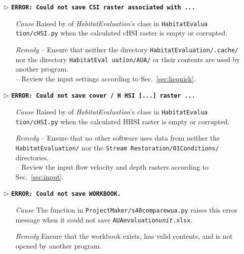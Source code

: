 \begin{itemize}
	\item[$\triangleright$]\textbf{\texttt{ERROR: Could not save CSI raster associated with ...}}
	\begin{itemize}
		\item[\textit{Cause}\hspace{0.27cm}] Raised by  of \textit{HabitatEvaluation}'s  class in \texttt{HabitatEvalua tion/cHSI.py} when the calculated cHSI raster is empty or corrupted.
		\item[\textit{Remedy}] -- Ensure that neither the directory \texttt{HabitatEvaluation/.cache/} nor the directory \texttt{HabitatEval uation/AUA/} or their contents are used by another program.\\
							 -- Review the input settings according to Sec.~\ref{sec:hequick}.\\
	\end{itemize}
	
	\item[$\triangleright$]\textbf{\texttt{ERROR: Could not save cover / H HSI [...] raster ...}}
	\begin{itemize}
		\item[\textit{Cause}\hspace{0.27cm}] Raised by  of \textit{HabitatEvaluation}'s  class in \texttt{HabitatEvalua tion/cHSI.py} when the calculated HHSI raster is empty or corrupted.
		\item[\textit{Remedy}]  -- Ensure that no other software uses data from neither the \texttt{HabitatEvaluation/} nor the \texttt{Stream Restoration/01{\myUnderscore}Conditions/} directories.\\
							 -- Review the input flow velocity and depth rasters according to Sec.~\ref{sec:input}.\\
	\end{itemize}
	
	\item[$\triangleright$]\textbf{\texttt{ERROR: Could not save WORKBOOK.}}
	\begin{itemize}
		\item[\textit{Cause}\hspace{0.27cm}] The  function in \texttt{ProjectMaker/s40{\myUnderscore}compare{\myUnderscore}wua.py} raises this error message when it could not save \texttt{AUA{\myUnderscore}evaluation\textit{{\myUnderscore}unit}.xlsx}.
		\item[\textit{Remedy}] Ensure that the workbook exists, has valid contents, and is not opened by another program.\\
	\end{itemize}
		

\end{itemize}
